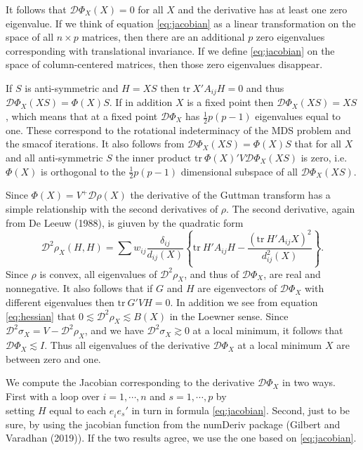 \documentclass[
  12pt,
]{article}
\begin{document}
It follows that \(\mathcal{D}\Phi_X(X)=0\) for all \(X\) and the derivative has at least one
zero eigenvalue. If we think of equation \eqref{eq:jacobian} as a linear transformation on the space of all \(n\times p\) matrices, then there are an additional \(p\) zero eigenvalues
corresponding with translational invariance. If we define \eqref{eq:jacobian}
on the space of column-centered matrices, then those zero eigenvalues disappear.

If \(S\) is anti-symmetric and
\(H=XS\) then \(\text{tr}\ X'A_{ij}H=0\) and thus \(\mathcal{D}\Phi_X(XS)=\Phi(X)S\).
If in addition \(X\) is a fixed point then \(\mathcal{D}\Phi_X(XS)=XS\),
which means that at a fixed point \(\mathcal{D}\Phi_X\) has \(\frac12p(p-1)\) eigenvalues equal to one. These correspond to the rotational indeterminacy of the MDS problem and the
smacof iterations. It also follows from \(\mathcal{D}\Phi_X(XS)=\Phi(X)S\) that for all \(X\) and all anti-symmetric \(S\) the inner product \(\text{tr}\ \Phi(X)'V\mathcal{D}\Phi_X(XS)\) is zero, i.e.~\(\Phi(X)\) is orthogonal to the \(\frac12 p(p-1)\) dimensional subspace of all
\(\mathcal{D}\Phi_X(XS)\).

Since \(\Phi(X)=V^+\mathcal{D}\rho(X)\) the derivative of the Guttman transform
has a simple relationship with the second derivatives of \(\rho\).
The second derivative, again from De Leeuw (1988), is giuven by the quadratic form
\begin{equation}
\mathcal{D}^2\rho_X(H,H)=\sum w_{ij}\frac{\delta_{ij}}{d_{ij}(X)}\left\{\text{tr}\ H'A_{ij}H-\frac{(\text{tr}\ H'A_{ij}X)^2}{d_{ij}^2(X)}\right\}.
\label{eq:hessian}
\end{equation}
Since \(\rho\) is convex, all eigenvalues of \(\mathcal{D}^2\rho_X\), and thus of \(\mathcal{D}\Phi_X\), are real and
nonnegative. It also follows that if \(G\) and \(H\) are eigenvectors
of \(\mathcal{D}\Phi_X\) with different eigenvalues then \(\text{tr}\ G'VH=0\). In addition we see from equation \eqref{eq:hessian} that
\(0\lesssim\mathcal{D}^2\rho_X\lesssim B(X)\)
in the Loewner sense. Since
\(\mathcal{D}^2\sigma_X=V-\mathcal{D}^2\rho_X\), and we have
\(\mathcal{D}^2\sigma_X\gtrsim 0\) at a local minimum, it follows that
\(\mathcal{D}\Phi_X\lesssim I\). Thus all eigenvalues of the derivative \(\mathcal{D}\Phi_X\) at a local minimum \(X\) are between zero and one.

We compute the Jacobian corresponding to the derivative \(\mathcal{D}\Phi_X\) in two ways. First with a loop over \(i=1,\cdots,n\) and \(s=1,\cdots,p\) by\\
setting \(H\) equal to each \(e_i^{\ }e_s'\) in turn in formula \eqref{eq:jacobian}. Second, just to be sure, by using the jacobian function from the numDeriv package (Gilbert and Varadhan (2019)). If the
two results agree, we use the one based on \eqref{eq:jacobian}.
\end{document}
